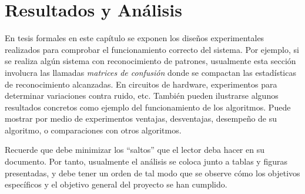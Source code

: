 \chapter{Resultados y Análisis}
\label{cap:resultados}

En tesis formales en este capítulo se exponen los diseños experimentales
realizados para comprobar el funcionamiento correcto del sistema. Por ejemplo,
si se realiza algún sistema con reconocimiento de patrones, usualmente esta
sección involucra las llamadas \emph{matrices de confusión} donde se compactan
las estadísticas de reconocimiento alcanzadas. En circuitos de hardware,
experimentos para determinar variaciones contra ruido, etc. También pueden
ilustrarse algunos resultados concretos como ejemplo del funcionamiento de los
algoritmos. Puede mostrar por medio de experimentos ventajas, desventajas,
desempeño de su algoritmo, o comparaciones con otros algoritmos.

Recuerde que debe minimizar los ``saltos'' que el lector deba hacer en su
documento. Por tanto, usualmente el análisis se coloca junto a tablas y figuras
presentadas, y debe tener un orden de tal modo que se observe cómo los
objetivos específicos y el objetivo general del proyecto se han cumplido.
